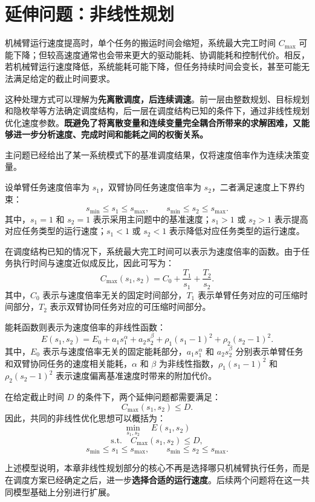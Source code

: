 \section{延伸问题：非线性规划}

机械臂运行速度提高时，单个任务的搬运时间会缩短，系统最大完工时间 $C_{\max}$ 可能下降；但较高速度通常也会带来更大的驱动能耗、协调能耗和控制代价。相反，若机械臂运行速度降低，系统能耗可能下降，但任务持续时间会变长，甚至可能无法满足给定的截止时间要求。

这种处理方式可以理解为\textbf{先离散调度，后连续调速}。前一层由整数规划、目标规划和隐枚举等方法确定调度结构，后一层在调度结构已知的条件下，通过非线性规划优化速度参数。\textbf{既避免了将离散变量和连续变量完全耦合所带来的求解困难，又能够进一步分析速度、完成时间和能耗之间的权衡关系。}


主问题已经给出了某一系统模式下的基准调度结果，仅将速度倍率作为连续决策变量。

设单臂任务速度倍率为 $s_1$，双臂协同任务速度倍率为 $s_2$，二者满足速度上下界约束：
\[
	s_{\min} \leq s_1 \leq s_{\max},
	\qquad
	s_{\min} \leq s_2 \leq s_{\max}.
\]
其中，$s_1=1$ 和 $s_2=1$ 表示采用主问题中的基准速度；$s_1>1$ 或 $s_2>1$ 表示提高对应任务类型的运行速度；$s_1<1$ 或 $s_2<1$ 表示降低对应任务类型的运行速度。

在调度结构已知的情况下，系统最大完工时间可以表示为速度倍率的函数。由于任务执行时间与速度近似成反比，因此可写为：
\[
	C_{\max}(s_1,s_2)
	=
	C_0
	+
	\frac{T_1}{s_1}
	+
	\frac{T_2}{s_2}.
\]
其中，$C_0$ 表示与速度倍率无关的固定时间部分，$T_1$ 表示单臂任务对应的可压缩时间部分，$T_2$ 表示双臂协同任务对应的可压缩时间部分。

能耗函数则表示为速度倍率的非线性函数：
\[
	E(s_1,s_2)
	=
	E_0
	+
	a_1 s_1^{\alpha}
	+
	a_2 s_2^{\beta}
	+
	\rho_1(s_1-1)^2
	+
	\rho_2(s_2-1)^2 .
\]
其中，$E_0$ 表示与速度倍率无关的固定能耗部分，$a_1 s_1^{\alpha}$ 和 $a_2 s_2^{\beta}$ 分别表示单臂任务和双臂协同任务的速度相关能耗，$\alpha$ 和 $\beta$ 为非线性指数，$\rho_1(s_1-1)^2$ 和 $\rho_2(s_2-1)^2$ 表示速度偏离基准速度时带来的附加代价。

在给定截止时间 $D$ 的条件下，两个延伸问题都需要满足：
\[
	C_{\max}(s_1,s_2) \leq D.
\]
因此，共同的非线性优化思想可以概括为：
\[
	\min_{s_1,s_2} \quad E(s_1,s_2)
\]
\[
	\mathrm{s.t.} \quad
	C_{\max}(s_1,s_2) \leq D,
\]
\[
	s_{\min} \leq s_1 \leq s_{\max},
	\qquad
	s_{\min} \leq s_2 \leq s_{\max}.
\]

上述模型说明，本章非线性规划部分的核心不再是选择哪只机械臂执行任务，而是在调度方案已经确定之后，进一步\textbf{选择合适的运行速度}。后续两个问题将在这一共同模型基础上分别进行扩展。




